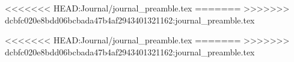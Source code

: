 \theoremstyle{remark}
\newtheorem{remark}{Remark}


\newcommand{\William}[1]{\textcolor{red}{[William] #1}}

\newcommand{\set}[1]{\left\{#1\right\}}
\newcommand*\diff{\mathop{}\!\mathrm{d}} %
\renewcommand{\st}{\colon} %
\newcommand{\N}{\mathbb{N}}
\newcommand{\R}{\mathbb{R}}
\newcommand{\Z}{\mathbb{Z}}
\newcommand{\Q}{\mathbb{Q}}
\newcommand{\RP}{\mathbb{RP}}
\newcommand{\Hyp}{\mathbb{H}}
\newcommand{\T}{\mathcal{T}}

<<<<<<< HEAD:Journal/journal_preamble.tex
\newcommand{\deriv}[1]{#1 '}
=======
>>>>>>> dcbfc020e8bdd06bcbada47b4af2943401321162:journal_preamble.tex
\newcommand{\der}{\mathsf{d}}
\newcommand{\crossratio}[1]{\operatorname{CR}\left[#1\right]}

\newcommand{\metricd}{\operatorname{d}}


\newcommand{\inquotes}[1]{``#1''}

\newcommand{\close}[1]{\overline{#1}}

\newcommand{\wrt}{\text{w.r.t. }}
<<<<<<< HEAD:Journal/journal_preamble.tex
\newcommand{\projof}[1]{\pi\left(#1\right)}
\newcommand{\proj}{\pi}
=======
\newcommand{\proj}[1]{\pi\left(#1\right)}
>>>>>>> dcbfc020e8bdd06bcbada47b4af2943401321162:journal_preamble.tex

\frenchspacing

\newenvironment{summary}{
	\hfill \break 
	\begin{center}
		\textbf{Summary:}
	\end{center}
	\begin{adjustwidth}{0.5in}{0.5in}
		
	
}{
\end{adjustwidth}
\bigskip
}

\usetikzlibrary{intersections}






